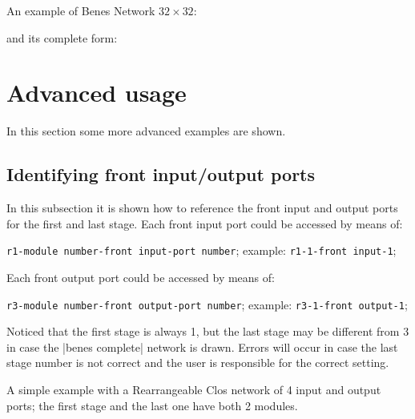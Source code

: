 \documentclass{ltxdoc}
\begin{document}
An example of Benes Network $32 \times 32$:
\begin{codeexample}[]
\tikzset{module size=0.6cm,pin length factor=0.6,
         module ysep=0.9, module xsep=1.7,}
\begin{tikzpicture}[P=32]
    \node[benes] {};
\end{tikzpicture}
\end{codeexample}
\pagebreak

and its complete form:
\begin{codeexample}[]
\tikzset{module size=0.6cm,pin length factor=0.6,
         module ysep=1, module xsep=2.275}
\begin{tikzpicture}[P=32]
    \node[benes complete={module label opacity=0}] {};
\end{tikzpicture}
\end{codeexample}


\section{Advanced usage}
In this section some more advanced examples are shown.

\subsection{Identifying front input/output ports}
In this subsection it is shown how to reference the front input and output ports for the first and last stage. Each front input port could be accessed by means of:
\begin{flushleft}
\verb|r1-|\bgroup\color{red!75!black}\verb|module number|\egroup\verb|-|\bgroup\color{red!75!black}\verb|front input|\egroup\verb|-|\bgroup\color{red!75!black}\verb|port number|\egroup; example: \verb|r1-1-front input-1|;
\end{flushleft}
Each front output port could be accessed by means of:
\begin{flushleft}
\verb|r3-|\bgroup\color{red!75!black}\verb|module number|\egroup\verb|-|\bgroup\color{red!75!black}\verb|front output|\egroup\verb|-|\bgroup\color{red!75!black}\verb|port number|\egroup; example: \verb|r3-1-front output-1|;
\end{flushleft}
Noticed that the first stage is always 1, but the last stage may be different from 3 in case the |benes complete| network is drawn. Errors will occur in case the last stage number is not correct and the user is responsible for the correct setting.

A simple example with a Rearrangeable Clos network of 4 input and output ports; the first stage and the last one have both 2 modules.
\end{document}

